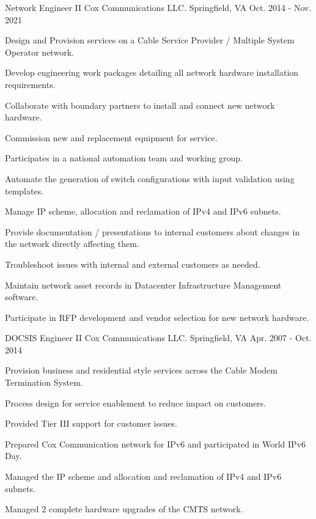 \begin{cventries}
  \cventry
    {Network Engineer II} %
    {Cox Communications LLC.} %
    {Springfield, VA} %
    {Oct. 2014 - Nov. 2021} %
    {
      \begin{cvitems} %
        \item{Design and Provision services on a Cable Service Provider / Multiple System Operator network.}
        \item{Develop engineering work packages detailing all network hardware installation requirements.}
        \item{Collaborate with boundary partners to install and connect new network hardware.}
        \item{Commission new and replacement equipment for service.}
        \item{Participates in a national automation team and working group.}
        \item{Automate the generation of switch configurations with input validation using templates.}
        \item{Manage IP scheme, allocation and reclamation of IPv4 and IPv6 subnets.}
        \item{Provide documentation / presentations to internal customers about changes in the network directly affecting them.}
        \item{Troubleshoot issues with internal and external customers as needed.}
        \item{Maintain network asset records in Datacenter Infrastructure Management software.}
        \item{Participate in RFP development and vendor selection for new network hardware.}
      \end{cvitems}
    }

  \cventry
    {DOCSIS Engineer II} %
    {Cox Communications LLC.} %
    {Springfield, VA} %
    {Apr. 2007 - Oct. 2014} %
    {
      \begin{cvitems} %
        \item {Provision business and residential style services across the Cable Modem Termination System.}
        \item {Process design for service enablement to reduce impact on customers.}
        \item {Provided Tier III support for customer issues.}
        \item {Prepared Cox Communication network for IPv6 and participated in World IPv6 Day.}
        \item {Managed the IP scheme and allocation and reclamation of IPv4 and IPv6 subnets.}
        \item {Managed 2 complete hardware upgrades of the CMTS network.}
      \end{cvitems}
    }


\end{cventries}
